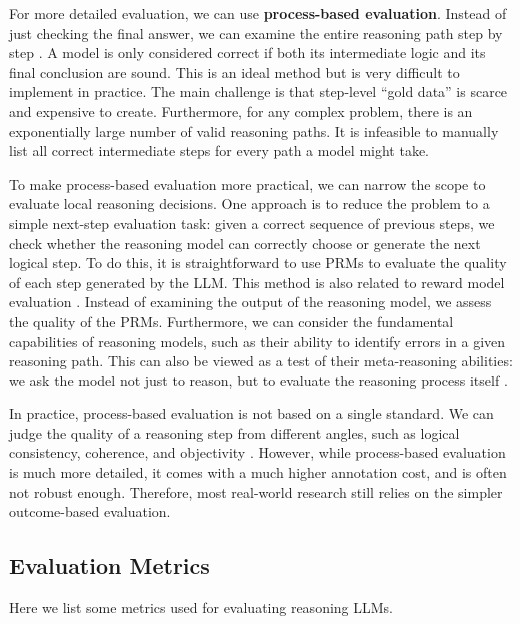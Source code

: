For more detailed evaluation, we can use \textbf{process-based evaluation}. Instead of just checking the final answer, we can examine the entire reasoning path step by step \cite{wang-etal:2024math,xia-etal:2025evaluating}. A model is only considered correct if both its intermediate logic and its final conclusion are sound. This is an ideal method but is very difficult to implement in practice. The main challenge is that step-level ``gold data'' is scarce and expensive to create. Furthermore, for any complex problem, there is an exponentially large number of valid reasoning paths. It is infeasible to manually list all correct intermediate steps for every path a model might take.

To make process-based evaluation more practical, we can narrow the scope to evaluate local reasoning decisions. One approach is to reduce the problem to a simple next-step evaluation task: given a correct sequence of previous steps, we check whether the reasoning model can correctly choose or generate the next logical step. To do this, it is straightforward to use PRMs to evaluate the quality of each step generated by the LLM. This method is also related to reward model evaluation \cite{lambert-etal:2025rewardbench}. Instead of examining the output of the reasoning model, we assess the quality of the PRMs. Furthermore, we can consider the fundamental capabilities of reasoning models, such as their ability to identify errors in a given reasoning path. This can also be viewed as a test of their meta-reasoning abilities: we ask the model not just to reason, but to evaluate the reasoning process itself \cite{zeng-etal:2024mr}.

In practice, process-based evaluation is not based on a single standard. We can judge the quality of a reasoning step from different angles, such as logical consistency, coherence, and objectivity \cite{lee-and-hockenmaier:2025evaluating}. However, while process-based evaluation is much more detailed, it comes with a much higher annotation cost, and is often not robust enough. Therefore, most real-world research still relies on the simpler outcome-based evaluation.

\subsection{Evaluation Metrics}

Here we list some metrics used for evaluating reasoning LLMs.

